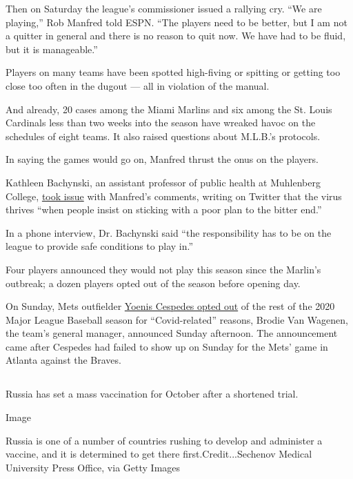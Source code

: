 Then on Saturday the league's commissioner issued a rallying cry. ``We
are playing,'' Rob Manfred told ESPN. ``The players need to be better,
but I am not a quitter in general and there is no reason to quit now. We
have had to be fluid, but it is manageable.''

Players on many teams have been spotted high-fiving or spitting or
getting too close too often in the dugout --- all in violation of the
manual.

And already, 20 cases among the Miami Marlins and six among the St.
Louis Cardinals less than two weeks into the season have wreaked havoc
on the schedules of eight teams. It also raised questions about M.L.B.'s
protocols.

In saying the games would go on, Manfred thrust the onus on the players.

Kathleen Bachynski, an assistant professor of public health at
Muhlenberg College,
\href{https://twitter.com/bachyns/status/1289665507117772800}{took
issue} with Manfred's comments, writing on Twitter that the virus
thrives ``when people insist on sticking with a poor plan to the bitter
end.''

In a phone interview, Dr. Bachynski said ``the responsibility has to be
on the league to provide safe conditions to play in.''

Four players announced they would not play this season since the
Marlin's outbreak; a dozen players opted out of the season before
opening day.

On Sunday, Mets outfielder
\href{https://www.nytimes3xbfgragh.onion/2020/08/02/sports/baseball/Yoenis-cespedes-opt-out-rule.html}{Yoenis
Cespedes opted out} of the rest of the 2020 Major League Baseball season
for ``Covid-related'' reasons, Brodie Van Wagenen, the team's general
manager, announced Sunday afternoon. The announcement came after
Cespedes had failed to show up on Sunday for the Mets' game in Atlanta
against the Braves.

\hypertarget{-8}{%
\subsection{}\label{-8}}

Russia has set a mass vaccination for October after a shortened trial.

Image

Russia is one of a number of countries rushing to develop and administer
a vaccine, and it is determined to get there first.Credit...Sechenov
Medical University Press Office, via Getty Images


